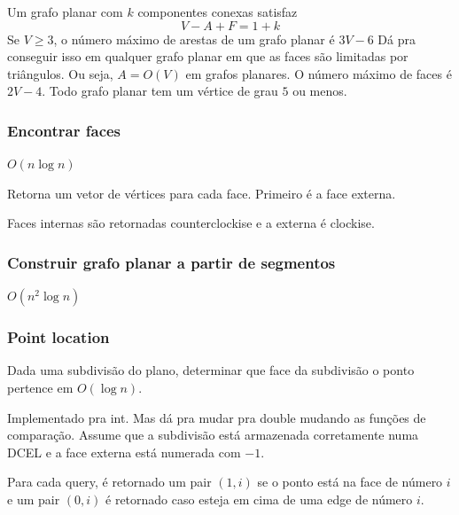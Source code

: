 Um grafo planar com $k$ componentes conexas satisfaz
$$V-A+F = 1+k$$
Se $V \geq 3$, o número máximo de arestas de um grafo planar é $3V-6$
Dá pra conseguir isso em qualquer grafo planar em que as faces são
limitadas por triângulos. Ou seja, $A=O(V)$ em grafos planares. O número
máximo de faces é $2V-4$. Todo grafo planar tem um vértice de grau $5$
ou menos.

\subsubsection{Encontrar faces}

$O(n \log n)$

Retorna um vetor de vértices para cada face. Primeiro é a face externa.

Faces internas são retornadas counterclockise e a externa é clockise.



\subsubsection{Construir grafo planar a partir de segmentos}
$O(n^2 \log n)$


\subsubsection{Point location}

Dada uma subdivisão do plano, determinar que face da subdivisão
o ponto pertence em $O(\log n)$.

Implementado pra int. Mas dá pra mudar pra double mudando as funções
de comparação. Assume que a subdivisão está armazenada corretamente numa
DCEL e a face externa está numerada com $-1$. 

Para cada query, é retornado um pair $(1, i)$ se o ponto está na face de
número $i$ e um pair $(0, i)$ é retornado caso esteja em cima de uma edge
de número $i$.

